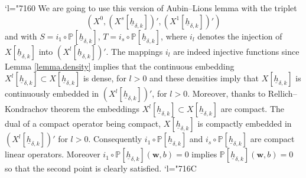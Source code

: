 \documentclass[11pt]{article}
\newcommand{\Changel}{\mathcode`l="7160}
\newcommand{\Changelback}{\mathcode`l="716C}
\theoremstyle{remark}
\theoremstyle{definition}
\newcommand{\wg}{\boldsymbol{w}}
\newcommand{\hb}{{\underline{h}}}
\begin{document}
\Changel
We are going to use this version of Aubin--Lions lemma with the triplet
\[
(X^0,(X^{s}[\hb_{\delta, k}])',(X^{1}[\hb_{\delta, k}])')
\]
and with $S= i_1\circ \mathbb{P}[\hb_{\delta, k}]$, $T=i_s\circ \mathbb{P}[\hb_{\delta, k}]$, where $i_l$ denotes the injection of $X[\hb_{\delta, k}]$ into $(X^{l}[\hb_{\delta, k}])'$. The mappings $i_l$ are indeed injective functions since Lemma \ref{lemma.density} implies that the continuous embedding $X^l[\hb_{\delta,k}] \subset X[\hb_{\delta, k}]$ is dense, for $l>0$ and these densities imply that $X[\hb_{\delta, k}]$ is continuously embedded in $(X^{l}[\hb_{\delta, k}])'$, for $l>0$. Moreover, thanks to Rellich--Kondrachov theorem the embeddings $X^l[\hb_{\delta,k}] \subset X[\hb_{\delta, k}]$ are compact. The dual of a compact operator being compact, $X[\hb_{\delta, k}] $ is compactly embedded in $(X^{l}[\hb_{\delta, k}])'$ for $l>0$. Consequently $i_1\circ \mathbb{P}[\hb_{\delta, k}]$ and $i_s\circ \mathbb{P}[\hb_{\delta, k}]$ are compact linear operators. Moreover $i_1\circ \mathbb{P}[\hb_{\delta, k}](\wg, b)=0$ implies $\mathbb{P}[\hb_{\delta, k}](\wg, b)=0$ so that the second point is clearly satisfied.
\Changelback
\end{document}

